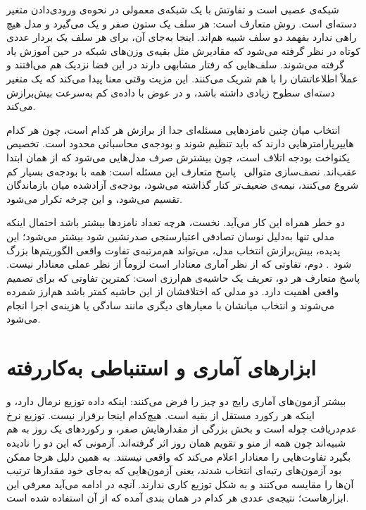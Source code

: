  شبکه‌ی عصبی است و تفاوتش با یک شبکه‌ی معمولی در
نحوه‌ی ورودی‌دادن متغیر دسته‌ای است. روش متعارف  است: هر سلف یک ستون صفر و
یک می‌گیرد و مدل هیچ راهی ندارد بفهمد دو سلف شبیه هم‌اند. اینجا به‌جای آن، برای هر سلف
یک بردار عددی کوتاه در نظر گرفته می‌شود که مقادیرش مثل بقیه‌ی وزن‌های شبکه در حین آموزش
یاد گرفته می‌شوند. سلف‌هایی که رفتار مشابهی دارند در این فضا نزدیک هم می‌افتند و عملاً
اطلاعاتشان را با هم شریک می‌کنند. این مزیت وقتی معنا پیدا می‌کند که یک متغیر دسته‌ای
سطوح زیادی داشته باشد، و در عوض با داده‌ی کم به‌سرعت بیش‌برازش می‌کند.


انتخاب میان چنین نامزدهایی مسئله‌ای جدا از برازش هر کدام است، چون هر کدام
هایپرپارامترهایی دارند که باید تنظیم شوند و بودجه‌ی محاسباتی محدود است. تخصیص یکنواخت
بودجه اتلاف است، چون بیشترش صرف مدل‌هایی می‌شود که از همان ابتدا عقب‌اند.
نصف‌سازی متوالی~\cite{JamiesonTalwalkar16halving}
پاسخ متعارف این مسئله است: همه با بودجه‌ی بسیار کم شروع می‌کنند، نیمه‌ی ضعیف‌تر کنار
گذاشته می‌شود، بودجه‌ی آزادشده میان بازماندگان تقسیم می‌شود، و این چرخه تکرار می‌شود.

دو خطر همراه این کار می‌آید. نخست، هرچه تعداد نامزدها بیشتر باشد احتمال اینکه مدلی
تنها به‌دلیل نوسان تصادفی اعتبارسنجی صدرنشین شود بیشتر می‌شود؛ این پدیده،
بیش‌برازش انتخاب مدل، می‌تواند هم‌مرتبه‌ی
تفاوت واقعی الگوریتم‌ها بزرگ شود~\cite{CawleyTalbot10selection}. دوم، تفاوتی که از نظر
آماری معنادار است لزوماً از نظر عملی معنادار نیست. پاسخ متعارف هر دو، تعریف یک
حاشیه‌ی هم‌ارزی است: کمترین تفاوتی که برای تصمیم واقعی
اهمیت دارد. دو مدلی که اختلافشان از این حاشیه کمتر باشد هم‌ارز شمرده می‌شوند و انتخاب
میانشان با معیارهای دیگری مانند سادگی یا هزینه‌ی اجرا انجام می‌شود.


\section{ابزارهای آماری و استنباطی به‌کاررفته}
\label{sec:2-6}

بیشتر آزمون‌های آماری رایج دو چیز را فرض می‌کنند: اینکه داده توزیع نرمال دارد، و اینکه
هر رکورد مستقل از بقیه است. هیچ‌کدام اینجا برقرار نیست. توزیع نرخ عدم‌دریافت چوله است و
بخش بزرگی از مقدارهایش صفر، و رکوردهای یک روز به هم شبیه‌اند چون همه از منو و تقویم همان
روز اثر گرفته‌اند. آزمونی که این دو را نادیده بگیرد تفاوت‌هایی را معنادار اعلام می‌کند که
واقعی نیستند. به همین دلیل هرجا ممکن بود آزمون‌های رتبه‌ای انتخاب شدند، یعنی آزمون‌هایی که
به‌جای خود مقدارها ترتیب آن‌ها را مقایسه می‌کنند و به شکل توزیع کاری ندارند. آنچه در
ادامه می‌آید معرفی این ابزارهاست؛ نتیجه‌ی عددی هر کدام در همان بندی آمده که از آن استفاده
شده است.

